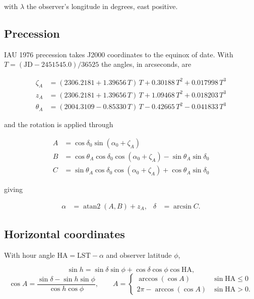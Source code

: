 \documentclass[11pt,a4paper]{article}
\begin{document}
with $\lambda$ the observer's longitude in degrees, east positive.

\subsection{Precession}

IAU 1976 precession \cite{lieske} takes J2000 coordinates to the equinox of date. With $T = (\text{JD} - 2451545.0)/36525$ the angles, in arcseconds, are

\begin{align}
\zeta_A  &= (2306.2181 + 1.39656\,T)\,T + 0.30188\,T^2 + 0.017998\,T^3 \\
z_A      &= (2306.2181 + 1.39656\,T)\,T + 1.09468\,T^2 + 0.018203\,T^3 \\
\theta_A &= (2004.3109 - 0.85330\,T)\,T - 0.42665\,T^2 - 0.041833\,T^3
\end{align}

and the rotation is applied through

\begin{align}
A &= \cos\delta_0 \sin(\alpha_0 + \zeta_A) \\
B &= \cos\theta_A\cos\delta_0\cos(\alpha_0 + \zeta_A) - \sin\theta_A\sin\delta_0 \\
C &= \sin\theta_A\cos\delta_0\cos(\alpha_0 + \zeta_A) + \cos\theta_A\sin\delta_0
\end{align}

giving

\begin{align}
\alpha &= \operatorname{atan2}(A, B) + z_A, &
\delta &= \arcsin C.
\end{align}

\subsection{Horizontal coordinates}

With hour angle $\text{HA} = \text{LST} - \alpha$ and observer latitude $\phi$,

\begin{equation}
\sin h = \sin\delta\sin\phi + \cos\delta\cos\phi\cos\text{HA},
\end{equation}
\begin{equation}
\cos A = \frac{\sin\delta - \sin h\sin\phi}{\cos h\cos\phi},
\qquad
A = \begin{cases}
\arccos(\cos A) & \sin\text{HA} \le 0 \\
2\pi - \arccos(\cos A) & \sin\text{HA} > 0.
\end{cases}
\end{equation}
\end{document}
